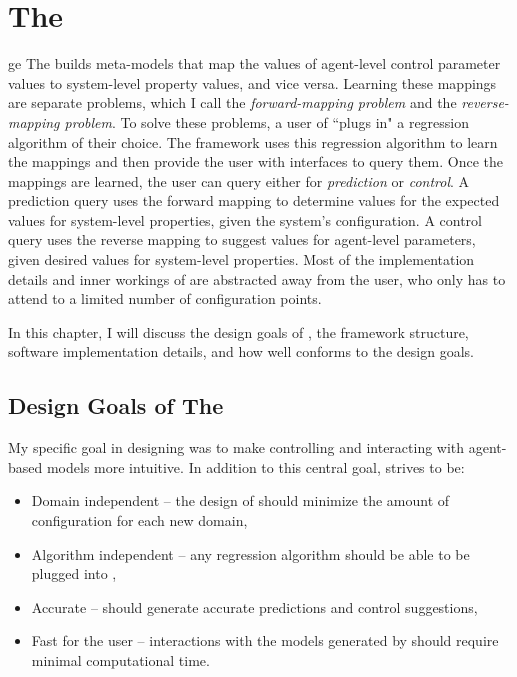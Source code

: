 \chapter{The \FRAMEWORK}
\thispagestyle{plain}

\label{Framework}

ge%
The \framework builds meta-models that map the values of agent-level control parameter values to system-level property values, and vice versa.
Learning these mappings are separate problems, which I call the \textit{forward-mapping problem} and the \textit{reverse-mapping problem}.
To solve these problems, a user of \fw ``plugs in" a regression algorithm of their choice.
The framework uses this regression algorithm to learn the mappings and then provide the user with interfaces to query them.
Once the mappings are learned, the user can query either for \textit{prediction} or \textit{control}.
A prediction query uses the forward mapping to determine values for the expected values for system-level properties, given the system's configuration.
A control query uses the reverse mapping to suggest values for agent-level parameters, given desired values for system-level properties.
Most of the implementation details and inner workings of \fw are abstracted away from the user, who only has to attend to a limited number of configuration points.

In this chapter, I will discuss the design goals of \fw, the framework structure, software implementation details, and how well \fw conforms to the design goals.


\section{Design Goals of The \framework}

My specific goal in designing \fw was to make controlling and interacting with agent-based models more intuitive.
In addition to this central goal, \fw strives to be:
\begin{itemize}
  \item Domain independent -- the design of \fw should minimize the amount of configuration for each new domain,
  \item Algorithm independent -- any regression algorithm should be able to be plugged into \fw,
  \item Accurate -- \fw should generate accurate predictions and control suggestions,
  \item Fast for the user -- interactions with the models generated by \fw should require minimal computational time.
\end{itemize}

